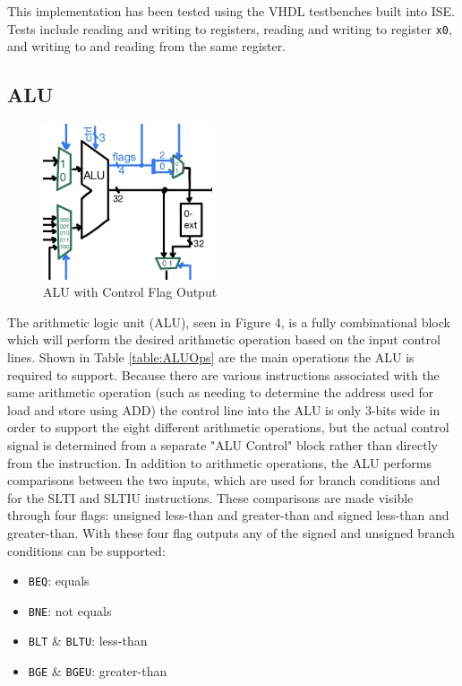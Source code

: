 \documentclass[lettersize,journal]{IEEEtran}
\begin{document}
This implementation has been tested using the VHDL testbenches built into ISE.
Tests include reading and writing to registers, reading and writing to register \verb|x0|, and writing to and reading from the same register.


\subsection{ALU}
\begin{figure}[!h]
    \label{fig:alublock}
    \centering
    \includegraphics[width=5cm]{ALU.jpg}
    \caption{ALU with Control Flag Output}
\end{figure}
The arithmetic logic unit (ALU), seen in Figure 4, is a fully combinational block which will perform the desired arithmetic operation based on the input control lines.
Shown in Table \ref{table:ALUOps} are the main operations the ALU is required to support. Because there are various instructions associated with the same
arithmetic operation (such as needing to determine the address used for load and store using ADD) the control line into the ALU is only 3-bits wide in order to support
the eight different arithmetic operations, but the actual control signal is determined from a separate "ALU Control" block rather than directly from the instruction.
In addition to arithmetic operations, the ALU performs comparisons between the two inputs, which are used for branch conditions and for the SLTI and SLTIU instructions.
These comparisons are made visible through four flags: unsigned less-than and greater-than and signed less-than and greater-than.
With these four flag outputs any of the signed and unsigned branch conditions can be supported:
\begin{itemize}
    \item \verb|BEQ|: equals
    \item \verb|BNE|: not equals
    \item \verb|BLT| \& \verb|BLTU|: less-than
    \item \verb|BGE| \& \verb|BGEU|: greater-than
\end{itemize}
\end{document}
